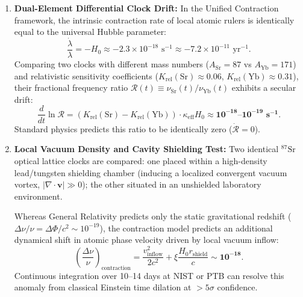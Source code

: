 \begin{enumerate}
    \item \textbf{Dual-Element Differential Clock Drift:}
          In the Unified Contraction framework, the intrinsic contraction rate of local atomic rulers is identically equal to the universal Hubble parameter:
          \begin{equation}
              \frac{\dot{\lambda}}{\lambda} = -H_0 \approx -2.3 \times 10^{-18}\text{ s}^{-1} \approx -7.2 \times 10^{-11}\text{ yr}^{-1}.
          \end{equation}
          Comparing two clocks with different mass numbers ($A_{\mathrm{Sr}} = 87$ vs $A_{\mathrm{Yb}} = 171$) and relativistic sensitivity coefficients ($K_{\mathrm{rel}}(\mathrm{Sr}) \approx 0.06$, $K_{\mathrm{rel}}(\mathrm{Yb}) \approx 0.31$), their fractional frequency ratio $\mathcal{R}(t) \equiv \nu_{\mathrm{Sr}}(t) / \nu_{\mathrm{Yb}}(t)$ exhibits a secular drift:
          \begin{equation}
              \frac{d}{dt} \ln \mathcal{R} = \left( K_{\mathrm{rel}}(\mathrm{Sr}) - K_{\mathrm{rel}}(\mathrm{Yb}) \right) \cdot \kappa_{\mathrm{eff}} H_0 \approx \mathbf{10^{-18}\text{--}10^{-19}\text{ s}^{-1}}.
              \label{eq:saat_suruklenme}
          \end{equation}
          Standard physics predicts this ratio to be identically zero ($\dot{\mathcal{R}} = 0$).
    \item \textbf{Local Vacuum Density and Cavity Shielding Test:}
          Two identical $^{87}\mathrm{Sr}$ optical lattice clocks are compared: one placed within a high-density lead/tungsten shielding chamber (inducing a localized convergent vacuum vortex, $|\nabla \cdot \mathbf{v}| \gg 0$); the other situated in an unshielded laboratory environment.

          Whereas General Relativity predicts only the static gravitational redshift ($\Delta \nu / \nu = \Delta \Phi / c^2 \sim 10^{-19}$), the contraction model predicts an additional dynamical shift in atomic phase velocity driven by local vacuum inflow:
          \begin{equation}
              \left( \frac{\Delta \nu}{\nu} \right)_{\mathrm{contraction}} = \frac{v_{\mathrm{inflow}}^2}{2c^2} + \xi \frac{H_0 r_{\mathrm{shield}}}{c} \sim \mathbf{10^{-18}}.
          \end{equation}
          Continuous integration over 10--14 days at NIST or PTB can resolve this anomaly from classical Einstein time dilation at $>5\sigma$ confidence.
\end{enumerate}

